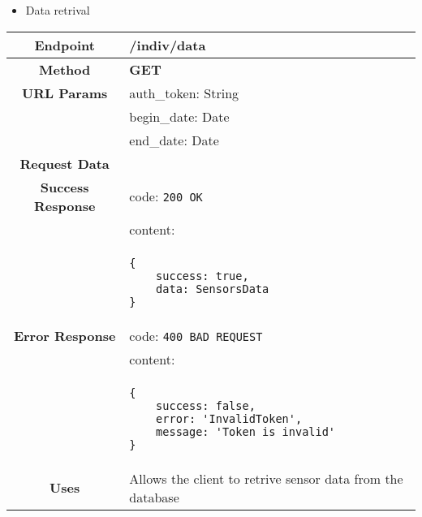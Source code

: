     \begin{itemize}
        \item Data retrival
    \end{itemize}
    \begin{adjustwidth}{1cm}{}
        \begin{longtable}{|c|l|}
            \hline
            \textbf{Endpoint} & /indiv/data \\
            \hline
            \textbf{Method} & \textbf{GET} \\
            \hline
            \textbf{URL Params} &  auth\_token: String \\
            & begin\_date: Date \\
            & end\_date: Date \\
            \hline
            \textbf{Request Data} &  \\
            \hline
            \textbf{Success Response} & code: \texttt{200 OK} \\
            &                           content: \\
            & \begin{minipage}[t]{0.5\textwidth}
                \begin{adjustwidth}{1.5cm}{}
                \begin{verbatim}
{
    success: true, 
    data: SensorsData
}
                \end{verbatim}
                \end{adjustwidth}
              \end{minipage} \\
              \hline
            \textbf{Error Response} & code: \texttt{400 BAD REQUEST} \\
            &                         content: \\
            & \begin{minipage}[t]{0.7\textwidth}
                \begin{adjustwidth}{1.5cm}{}
                \begin{verbatim}
{
    success: false, 
    error: 'InvalidToken',
    message: 'Token is invalid'
}
                \end{verbatim}
                \end{adjustwidth}
              \end{minipage} \\
              \hline
            \textbf{Uses} & Allows the client to retrive sensor data from the database \\

\end{longtable}
\end{adjustwidth}
